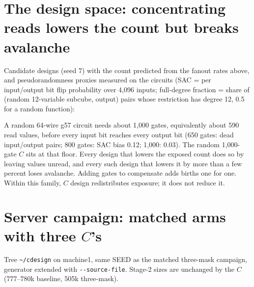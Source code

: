 \documentclass[11pt]{article}
\newcommand{\code}[1]{\texttt{#1}}
\begin{document}
\section{The design space: concentrating reads lowers the count but breaks avalanche}
Candidate designs (seed 7) with the count predicted from the fanout rates above, and pseudorandomness proxies measured on the circuits (SAC = per input/output bit flip probability over 4,096 inputs; full-degree fraction = share of (random 12-variable subcube, output) pairs whose restriction has degree 12, 0.5 for a random function):

\begin{center}\footnotesize
{}
\end{center}

A random 64-wire g57 circuit needs about 1,000 gates, equivalently about 590 read values, before every input bit reaches every output bit (650 gates: dead input/output pairs; 800 gates: SAC bias 0.12; 1,000: 0.03). The random 1,000-gate $C$ sits at that floor. Every design that lowers the exposed count does so by leaving values unread, and every such design that lowers it by more than a few percent loses avalanche. Adding gates to compensate adds births one for one. Within this family, $C$ design redistributes exposure; it does not reduce it.

\section{Server campaign: matched arms with three $C$'s}
Tree \code{\textasciitilde/cdesign} on machine1, same SEED as the matched three-mask campaign, generator extended with \code{-{}-source-file}. Stage-2 sizes are unchanged by the $C$ (777--780k baseline, 505k three-mask).
\end{document}
